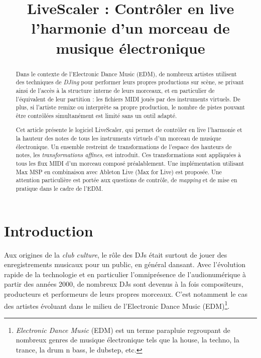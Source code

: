\documentclass{article}
\title{LiveScaler : Contrôler en live l'harmonie d'un morceau de musique électronique}
\begin{document}
\maketitle

\sloppy

\begin{abstract}
Dans le contexte de l'Electronic Dance Music (EDM), de nombreux artistes utilisent des techniques de \emph{DJing} pour performer leurs propres productions sur scène, se privant ainsi de l'accès à la structure interne de leurs morceaux, et en particulier de l'équivalent de leur partition : les fichiers MIDI joués par des instruments virtuels. De plus, si l'artiste remixe ou interprète sa propre production, le nombre de pistes pouvant être contrôlées simultanément est limité sans un outil adapté.

Cet article présente le logiciel LiveScaler, qui permet de contrôler en live l'harmonie et la hauteur des notes de tous les instruments virtuels d'un morceau de musique électronique. Un ensemble restreint de transformations de l'espace des hauteurs de notes, les \emph{transformations affines}, est introduit. Ces transformations sont appliquées à tous les flux MIDI d'un morceau composé préalablement. Une implémentation utilisant Max MSP en combinaison avec Ableton Live (Max for Live) est proposée. Une attention particulière est portée aux questions de contrôle, de \emph{mapping} et de mise en pratique dans le cadre de l'EDM.
\end{abstract}

\section{Introduction}
Aux origines de la \emph{club culture}, le rôle des DJs était surtout de jouer des enregistrements musicaux pour un public, en général dansant. Avec l’évolution rapide de la technologie et en particulier l’omniprésence de l’audionumérique à partir des années 2000, de nombreux DJs sont devenus à la fois compositeurs, producteurs et performeurs de leurs propres morceaux. C'est notamment le cas des artistes évoluant dans le milieu de l'Electronic Dance Music (EDM)\footnote{\emph{Electronic Dance Music} (EDM) est un terme parapluie regroupant de nombreux genres de musique électronique tels que la house, la techno, la trance, la drum n bass, le dubstep, etc. }.
\end{document}
